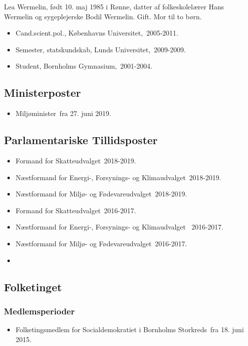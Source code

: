 \documentclass[11pt, a4paper]{awesome-cv}
\begin{document}
\makecvheader[R]
\makelettertitle
\begin{cvletter}
Lea Wermelin, født 10. maj 1985 i Rønne, datter af folkeskolelærer Hans Wermelin og sygeplejerske Bodil Wermelin. Gift. Mor til to børn. 

\begin{itemize}
\item Cand.scient.pol., Københavns Universitet, 2005-2011.
\item Semester, statskundskab, Lunds Universitet, 2009-2009.
\item Student, Bornholms Gymnasium, 2001-2004.
\end{itemize}
\subsection*{Ministerposter}
\begin{itemize}
\item Miljøminister fra 27. juni 2019.
\end{itemize}
\subsection*{Parlamentariske Tillidsposter}
\begin{itemize}
\item Formand for Skatteudvalget 2018-2019.
\item Næstformand for Energi-, Forsynings- og Klimaudvalget 2018-2019.
\item Næstformand for Miljø- og Fødevareudvalget 2018-2019.
\item Formand for Skatteudvalget 2016-2017.
\item Næstformand for Energi-, Forsynings- og Klimaudvalget  2016-2017.
\item Næstformand for Miljø- og Fødevareudvalget 2016-2017.
\item 
\end{itemize}
\subsection*{Folketinget}
\subsubsection*{Medlemsperioder}
\begin{itemize}
\item Folketingsmedlem for Socialdemokratiet i Bornholms Storkreds fra 18. juni 2015.
\end{itemize}

\end{cvletter}
\end{document}
